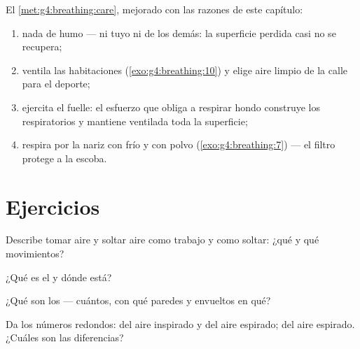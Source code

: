 \begin{method}\label{met:g7:lungs-and-gas-exchange:keep}
El \cref{met:g4:breathing:care}, mejorado con las razones de este
capítulo:
\begin{enumerate}
  \item nada de humo --- ni tuyo ni de los demás: la superficie perdida
        casi no se recupera;
  \item ventila las habitaciones (\cref{exo:g4:breathing:10}) y elige
        aire limpio de la calle para el deporte;
  \item ejercita el fuelle: el esfuerzo que obliga a respirar hondo
        construye los  respiratorios y mantiene ventilada toda
        la superficie;
  \item respira por la nariz con frío y con polvo
        (\cref{exo:g4:breathing:7}) --- el filtro protege a la escoba.
\end{enumerate}
\end{method}

\section{Ejercicios}

\begin{exercise}[$\star$]\label{exo:g7:lungs-and-gas-exchange:1}
Describe tomar aire y soltar aire como trabajo y como soltar: ¿qué
 y qué movimientos?
\end{exercise}

\begin{exercise}[$\star$]\label{exo:g7:lungs-and-gas-exchange:2}
¿Qué es el  y dónde está?
\end{exercise}

\begin{exercise}[$\star$]\label{exo:g7:lungs-and-gas-exchange:3}
¿Qué son los  --- cuántos, con qué paredes y envueltos en qué?
\end{exercise}

\begin{exercise}[$\star$]\label{exo:g7:lungs-and-gas-exchange:4}
Da los números redondos:  del aire inspirado y del aire
espirado;  del aire espirado. ¿Cuáles son las
diferencias?
\end{exercise}

